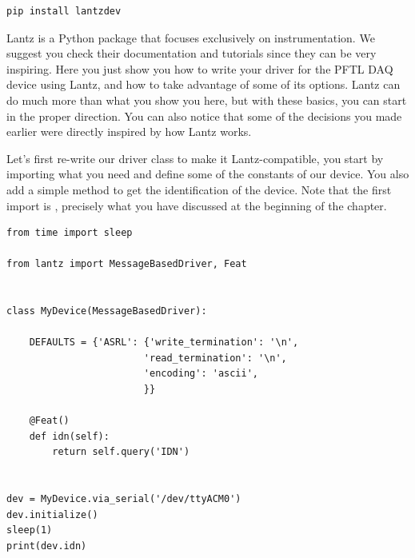 \begin{verbatim}
pip install lantzdev
\end{verbatim}


Lantz is a Python package that focuses exclusively on instrumentation. We suggest you check their documentation and tutorials since they can be very inspiring. Here you just show you how to write your driver for the {PFTL DAQ} device using Lantz, and how to take advantage of some of its options. Lantz can do much more than what you show you here, but with these basics, you can start in the proper direction. You can also notice that some of the decisions you made earlier were directly inspired by how Lantz works.

Let's first re-write our driver class to make it Lantz-compatible, you start by importing what you need and define some of the constants of our device. You also add a simple method to get the identification of the device. Note that the first import is , precisely what you have discussed at the beginning of the chapter.

\begin{verbatim}
from time import sleep

from lantz import MessageBasedDriver, Feat


class MyDevice(MessageBasedDriver):

    DEFAULTS = {'ASRL': {'write_termination': '\n',
                        'read_termination': '\n',
                        'encoding': 'ascii',
                        }}

    @Feat()
    def idn(self):
        return self.query('IDN')


dev = MyDevice.via_serial('/dev/ttyACM0')
dev.initialize()
sleep(1)
print(dev.idn)
\end{verbatim}

